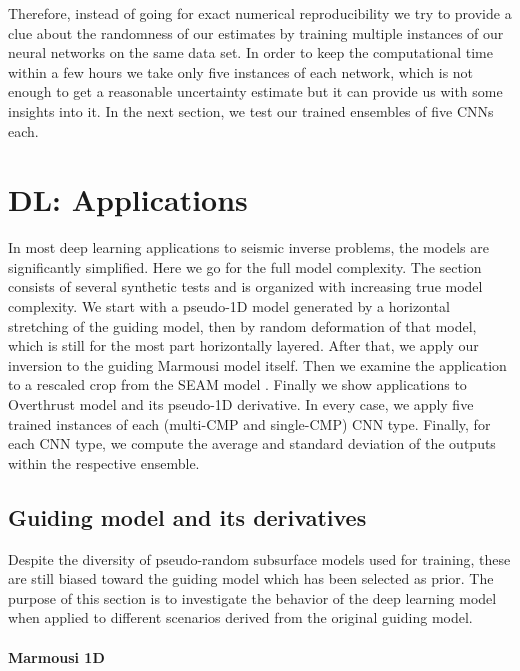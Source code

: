 \documentclass[paper,twocolomn]{geophysics}
\begin{document}
Therefore, instead of going for exact numerical reproducibility we try to provide a clue about the randomness of our estimates by training multiple instances of our neural networks on the same data set. In order to keep the computational time within a few hours we take only five instances of each network, which is not enough to get a reasonable uncertainty estimate but it can provide us with some insights into it. In the next section, we test our trained ensembles of five CNNs each.

\section{DL: Applications}
In most deep learning applications to seismic inverse problems, the models are significantly simplified. Here we go for the full model complexity. The section consists of several synthetic tests and is organized with increasing true model complexity. We start with a pseudo-1D model generated by a horizontal stretching of the guiding model, then by random deformation of that model, which is still for the most part horizontally layered. After that, we apply our inversion to the guiding Marmousi model itself. Then we examine the application to a rescaled crop from the SEAM model \citep{fehler2011seam}.  Finally we show applications to Overthrust model and its pseudo-1D derivative. In every case, we apply five trained instances of each (multi-CMP and single-CMP) CNN type. Finally, for each CNN type, we compute the average and standard deviation of the outputs within the respective ensemble.


\subsection{Guiding model and its derivatives}

Despite the diversity of pseudo-random subsurface models used for training, these are still biased toward the guiding model which has been selected as prior. The purpose of this section is to investigate the behavior of the deep learning model when applied to different scenarios derived from the original guiding model.

\paragraph{Marmousi 1D}
\newcommand{\modelFname}{marmvel1D}
\end{document}
